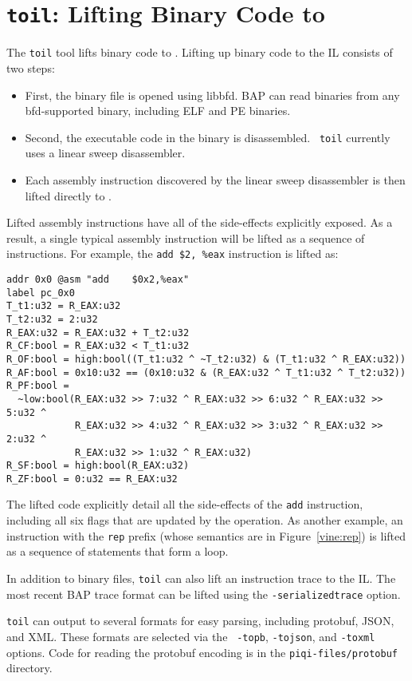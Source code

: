 \section{\texttt{toil}: Lifting Binary Code to \bil}

The {\tt toil} tool lifts binary code to \bil.  Lifting up binary code
to the IL consists of two steps:
\begin{itemize}
\item First, the binary file is opened using libbfd. BAP can read
  binaries from any bfd-supported binary, including ELF and PE
  binaries.

\item Second, the executable code in the binary is disassembled.  {\tt
  toil} currently uses a linear sweep disassembler.

\item Each assembly instruction discovered by the linear sweep disassembler
  is then lifted directly to \bil.
\end{itemize}

Lifted assembly instructions have all of the side-effects explicitly
exposed.  As a result, a single typical assembly instruction will be
lifted as a sequence of \bil instructions.  For example, the {\tt add
  \$2, \%eax} instruction is lifted as:

\begin{centering}
\begin{scriptsize}
\begin{verbatim}
addr 0x0 @asm "add    $0x2,%eax"
label pc_0x0
T_t1:u32 = R_EAX:u32
T_t2:u32 = 2:u32
R_EAX:u32 = R_EAX:u32 + T_t2:u32
R_CF:bool = R_EAX:u32 < T_t1:u32
R_OF:bool = high:bool((T_t1:u32 ^ ~T_t2:u32) & (T_t1:u32 ^ R_EAX:u32))
R_AF:bool = 0x10:u32 == (0x10:u32 & (R_EAX:u32 ^ T_t1:u32 ^ T_t2:u32))
R_PF:bool =
  ~low:bool(R_EAX:u32 >> 7:u32 ^ R_EAX:u32 >> 6:u32 ^ R_EAX:u32 >> 5:u32 ^
            R_EAX:u32 >> 4:u32 ^ R_EAX:u32 >> 3:u32 ^ R_EAX:u32 >> 2:u32 ^
            R_EAX:u32 >> 1:u32 ^ R_EAX:u32)
R_SF:bool = high:bool(R_EAX:u32)
R_ZF:bool = 0:u32 == R_EAX:u32
\end{verbatim}
\end{scriptsize}
\end{centering}

The lifted \bil code explicitly detail all the side-effects of the
{\tt add} instruction, including all six flags that are updated by the
operation.  As another example, an instruction with the {\tt rep}
prefix (whose semantics are in Figure~\ref{vine:rep}) is lifted as a
sequence of statements that form a loop.

In addition to binary files, {\tt toil} can also lift an instruction
trace to the IL.  The most recent BAP trace format can be lifted using
the {\tt -serializedtrace} option.

{\tt toil} can output to several formats for easy parsing, including
protobuf, JSON, and XML.  These formats are selected via the {\tt
  -topb}, {\tt -tojson}, and {\tt -toxml} options.  Code for reading
the protobuf encoding is in the {\tt piqi-files/protobuf} directory.

